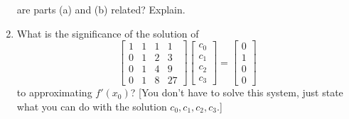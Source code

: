 \documentclass{article}
\begin{document}
\begin{enumerate}
		are parts (a) and (b) related? Explain.
	\item What is the significance of the solution of
		\[
			\begin{bmatrix}
				1 & 1 & 1 & 1\\
				0 & 1 & 2 & 3\\
				0 & 1 & 4 & 9\\
				0 & 1 & 8 & 27
			\end{bmatrix}
			\begin{bmatrix} c_0 \\ c_1 \\ c_2 \\ c_3 \end{bmatrix}
			= \begin{bmatrix} 0 \\ 1 \\ 0 \\ 0 \end{bmatrix}
		\]
		to approximating $f'(x_0)$?
		[You don't have to solve this system, just state what you can do
		with the solution $c_0,c_1,c_2,c_3$.]
\end{enumerate}
\end{document}
